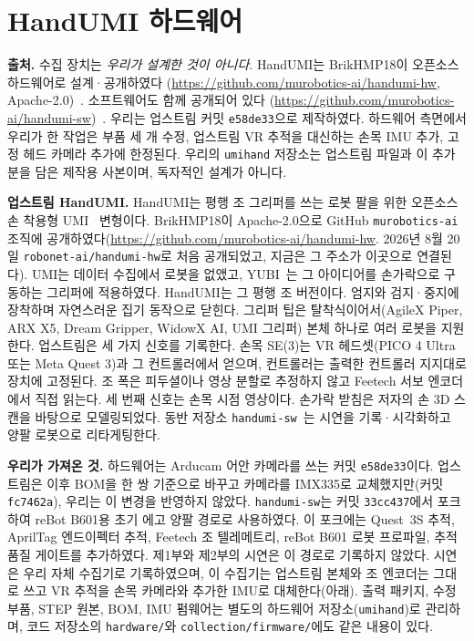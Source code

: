 \documentclass[conference,10pt]{IEEEtran}
\begin{document}
\section{HandUMI 하드웨어}\label{p1:sec:hw}
\textbf{출처.} 수집 장치는 \emph{우리가 설계한 것이 아니다}. HandUMI는 BrikHMP18이 오픈소스 하드웨어로 설계·공개하였다
(\url{https://github.com/murobotics-ai/handumi-hw}, Apache-2.0)~\cite{handumi_hw}. 소프트웨어도 함께 공개되어 있다
(\url{https://github.com/murobotics-ai/handumi-sw})~\cite{handumi_sw}. 우리는 업스트림 커밋 \texttt{e58de33}으로 제작하였다.
하드웨어 측면에서 우리가 한 작업은 부품 세 개 수정, 업스트림 VR 추적을 대신하는 손목 IMU 추가, 고정 헤드 카메라 추가에 한정된다.
우리의 \texttt{umihand} 저장소는 업스트림 파일과 이 추가분을 담은 제작용 사본이며, 독자적인 설계가 아니다.

\textbf{업스트림 HandUMI.} HandUMI는 평행 조 그리퍼를 쓰는 로봇 팔을 위한 오픈소스 손 착용형 UMI~\cite{chi2024umi} 변형이다.
BrikHMP18이 Apache-2.0으로 GitHub \texttt{murobotics-ai} 조직에 공개하였다(\url{https://github.com/murobotics-ai/handumi-hw}.
2026년 8월 20일 \texttt{robonet-ai/handumi-hw}로 처음 공개되었고, 지금은 그 주소가 이곳으로 연결된다). UMI는 데이터 수집에서 로봇을
없앴고, YUBI~\cite{ohkawa2026yubi}는 그 아이디어를 손가락으로 구동하는 그리퍼에 적용하였다. HandUMI는 그 평행 조 버전이다. 엄지와
검지·중지에 장착하며 자연스러운 집기 동작으로 닫힌다. 그리퍼 팁은 탈착식이어서(AgileX Piper, ARX X5, Dream Gripper, WidowX AI,
UMI 그리퍼) 본체 하나로 여러 로봇을 지원한다. 업스트림은 세 가지 신호를 기록한다. 손목 SE(3)는 VR 헤드셋(PICO 4 Ultra 또는 Meta
Quest 3)과 그 컨트롤러에서 얻으며, 컨트롤러는 출력한 컨트롤러 지지대로 장치에 고정된다. 조 폭은 피두셜이나 영상 분할로 추정하지
않고 Feetech 서보 엔코더에서 직접 읽는다. 세 번째 신호는 손목 시점 영상이다. 손가락 받침은 저자의 손 3D 스캔을 바탕으로 모델링되었다.
동반 저장소 \texttt{handumi-sw}~\cite{handumi_sw}는 시연을 기록·시각화하고 양팔 로봇으로 리타게팅한다.

\textbf{우리가 가져온 것.} 하드웨어는 Arducam 어안 카메라를 쓰는 커밋 \texttt{e58de33}이다. 업스트림은 이후 BOM을 한 쌍 기준으로 바꾸고
카메라를 IMX335로 교체했지만(커밋 \texttt{fc7462a}), 우리는 이 변경을 반영하지 않았다. \texttt{handumi-sw}는 커밋 \texttt{33cc437}에서
포크하여 reBot B601용 초기 에고 양팔 경로로 사용하였다. 이 포크에는 Quest~3S 추적, AprilTag 엔드이펙터 추적, Feetech 조 텔레메트리,
reBot B601 로봇 프로파일, 추적 품질 게이트를 추가하였다. 제1부와 제2부의 시연은 이 경로로 기록하지 않았다. 시연은 우리 자체
수집기로 기록하였으며, 이 수집기는 업스트림 본체와 조 엔코더는 그대로 쓰고 VR 추적을 손목 카메라와 추가한 IMU로 대체한다(아래).
출력 패키지, 수정 부품, STEP 원본, BOM, IMU 펌웨어는 별도의 하드웨어 저장소(\texttt{umihand})로 관리하며, 코드 저장소의
\texttt{hardware/}와 \texttt{collection/firmware/}에도 같은 내용이 있다.
\end{document}
